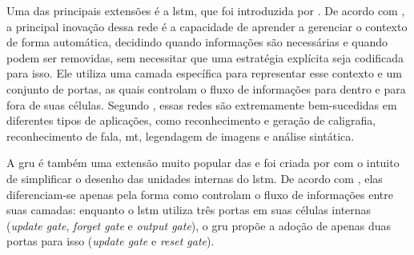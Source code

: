 Uma das principais extensões é a \acrshort{lstm}, que foi introduzida por . De acordo com , a principal inovação dessa rede é a capacidade de aprender a gerenciar o contexto de forma automática, decidindo quando informações são necessárias e quando podem ser removidas, sem necessitar que uma estratégia explícita seja codificada para isso. Ele utiliza uma camada específica para representar esse contexto e um conjunto de portas, as quais controlam o fluxo de informações para dentro e para fora de suas células.
Segundo , essas redes são extremamente bem-sucedidas em diferentes tipos de aplicações, como reconhecimento e geração de caligrafia, reconhecimento de fala, \acrfull{mt}, legendagem de imagens e análise sintática.




A \acrshort{gru} é também uma extensão muito popular das  e foi criada por  com o intuito de simplificar o desenho das unidades internas do \acrshort{lstm}. 
De acordo com , elas diferenciam-se apenas pela forma como controlam o fluxo de informações entre suas camadas: enquanto o \acrshort{lstm} utiliza três portas em suas células internas (\textit{update gate}, \textit{forget gate} e \textit{output gate}), o \acrshort{gru} propõe a adoção de apenas duas portas para isso (\textit{update gate} e \textit{reset gate}).

